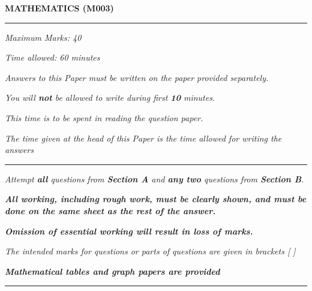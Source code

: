 \begin{center}
   \Large
   \textbf{MATHEMATICS (M003)}
   \rule{\textwidth}{0.4pt}
   \normalsize
   \textit{Maximum Marks: 40}

   \textit{Time allowed: 60 minutes}

   \textit{Answers to this Paper must be written on the paper provided separately.}

   \textit{You will \textbf{not} be allowed to write during first \textbf{10} minutes.}

   \textit{This time is to be spent in reading the question paper.}

   \textit{The time given at the head of this Paper is the time allowed for writing the answers}
   \rule{\textwidth}{0.4pt}
   \small

   \textit{Attempt \textbf{all} questions from \textbf{Section A} and \textbf{any two} questions from \textbf{Section B}.}

   \textit{\textbf{All working, including rough work, must be clearly shown, and must be done on the same sheet as the rest of the answer.}}

   \textit{\textbf{Omission of essential working will result in loss of marks.}}

   \textit{The intended marks for questions or parts of questions are given in brackets [ ]}

   \textit{\textbf{Mathematical tables and graph papers are provided}}
   \rule{\textwidth}{0.4pt}
\end{center}
